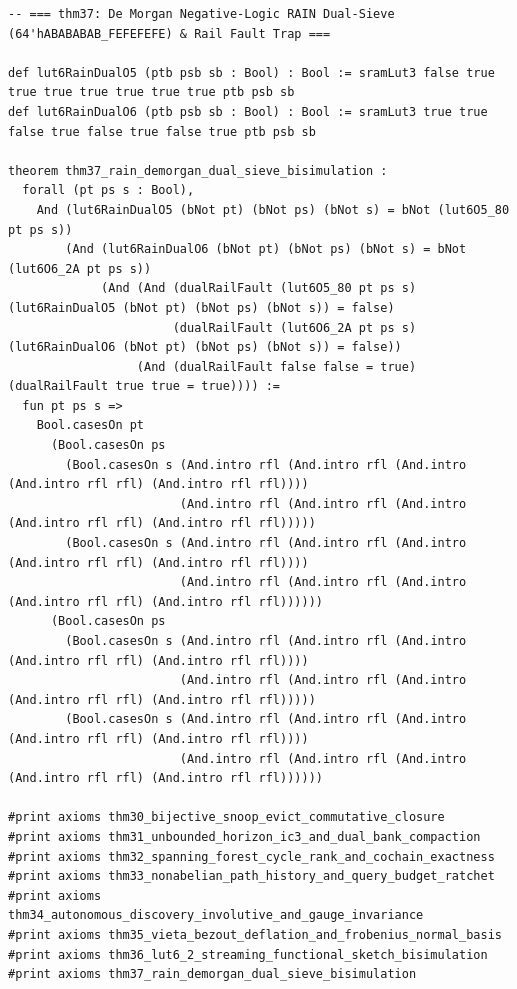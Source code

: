 \documentclass[10pt,twocolumn]{article}
\theoremstyle{spectralthm}
\begin{document}
\begin{lstlisting}[language=Lean4,caption={Standalone Pure Init.Prelude Term-Mode Lean 4 Expansion (thm30--thm37, v1.1.0, 0 sorry, 0 axioms).},label={lst:lean_v110}]
-- === thm37: De Morgan Negative-Logic RAIN Dual-Sieve (64'hABABABAB_FEFEFEFE) & Rail Fault Trap ===

def lut6RainDualO5 (ptb psb sb : Bool) : Bool := sramLut3 false true true true true true true true ptb psb sb
def lut6RainDualO6 (ptb psb sb : Bool) : Bool := sramLut3 true true false true false true false true ptb psb sb

theorem thm37_rain_demorgan_dual_sieve_bisimulation :
  forall (pt ps s : Bool),
    And (lut6RainDualO5 (bNot pt) (bNot ps) (bNot s) = bNot (lut6O5_80 pt ps s))
        (And (lut6RainDualO6 (bNot pt) (bNot ps) (bNot s) = bNot (lut6O6_2A pt ps s))
             (And (And (dualRailFault (lut6O5_80 pt ps s) (lut6RainDualO5 (bNot pt) (bNot ps) (bNot s)) = false)
                       (dualRailFault (lut6O6_2A pt ps s) (lut6RainDualO6 (bNot pt) (bNot ps) (bNot s)) = false))
                  (And (dualRailFault false false = true) (dualRailFault true true = true)))) :=
  fun pt ps s =>
    Bool.casesOn pt
      (Bool.casesOn ps
        (Bool.casesOn s (And.intro rfl (And.intro rfl (And.intro (And.intro rfl rfl) (And.intro rfl rfl))))
                        (And.intro rfl (And.intro rfl (And.intro (And.intro rfl rfl) (And.intro rfl rfl)))))
        (Bool.casesOn s (And.intro rfl (And.intro rfl (And.intro (And.intro rfl rfl) (And.intro rfl rfl))))
                        (And.intro rfl (And.intro rfl (And.intro (And.intro rfl rfl) (And.intro rfl rfl))))))
      (Bool.casesOn ps
        (Bool.casesOn s (And.intro rfl (And.intro rfl (And.intro (And.intro rfl rfl) (And.intro rfl rfl))))
                        (And.intro rfl (And.intro rfl (And.intro (And.intro rfl rfl) (And.intro rfl rfl)))))
        (Bool.casesOn s (And.intro rfl (And.intro rfl (And.intro (And.intro rfl rfl) (And.intro rfl rfl))))
                        (And.intro rfl (And.intro rfl (And.intro (And.intro rfl rfl) (And.intro rfl rfl))))))

#print axioms thm30_bijective_snoop_evict_commutative_closure
#print axioms thm31_unbounded_horizon_ic3_and_dual_bank_compaction
#print axioms thm32_spanning_forest_cycle_rank_and_cochain_exactness
#print axioms thm33_nonabelian_path_history_and_query_budget_ratchet
#print axioms thm34_autonomous_discovery_involutive_and_gauge_invariance
#print axioms thm35_vieta_bezout_deflation_and_frobenius_normal_basis
#print axioms thm36_lut6_2_streaming_functional_sketch_bisimulation
#print axioms thm37_rain_demorgan_dual_sieve_bisimulation
\end{lstlisting}
\end{document}

